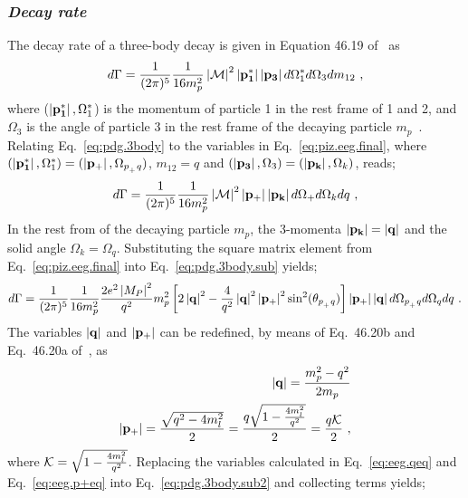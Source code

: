 \subsubsection{\emph{Decay rate}}
The decay rate of a three-body decay is given in Equation 46.19 of~\cite{pdg2014} as
\begin{align}\label{eq:pdg.3body}
d\Gamma = \frac{1}{(2 \pi)^5} \frac{1}{16 m_p^2} \left|{\cal M}\right|^2 \left|\bf{p_1^*}\right| \left|\bf{p_3}\right|d\Omega_1^*d\Omega_3 dm_{12} \ ,
\end{align}
%
where ($\left|\bf{p_1^*}\right|,\Omega_1^*$) is the momentum of particle 1 in the rest frame of 1 and 2, and $\Omega_3$ is the angle of particle 3 in the rest frame of the decaying particle $m_p$~\cite{pdg2014}. Relating Eq.~\ref{eq:pdg.3body} to the variables in Eq.~\ref{eq:piz.eeg.final}, where $(\left|\bf{p_1^*}\right|,\Omega_1^*) = (\left|\bf{p_+}\right|,\Omega_{p_{_+}q})$, $m_{12} = q$ and $(\left|\bf{p_3}\right|,\Omega_3) = (\left|\bf{p_k}\right|,\Omega_k)$, reads;
\begin{align}\label{eq:pdg.3body.sub}
d\Gamma = \frac{1}{(2 \pi)^5} \frac{1}{16 m_p^2} \left|{\cal M}\right|^2 \left|\bf{p_+}\right| \left|\bf{p_k}\right|d\Omega_+d\Omega_k dq \ ,
\end{align}
%
In the rest from of the decaying particle $m_p$, the 3-momenta $\left|\bf{p_k}\right| = \left|\bf{q}\right|$ and the solid angle $\Omega_k = \Omega_q$. Substituting the square matrix element from Eq.~\ref{eq:piz.eeg.final} into Eq.~\ref{eq:pdg.3body.sub} yields;
%
\begin{align}\label{eq:pdg.3body.sub2}
d\Gamma = \frac{1}{(2 \pi)^5} \frac{1}{16 m_p^2} \frac{2e^{2}\left|M_{P}\right|^{2}}{q^{2}}m_p^2
\left[2\left|\bf{q}\right|^2 - \frac{4}{q^2} \left|\bf{q}\right|^2 \left|\bf{p_{+}}\right|^2 \sin^2(\theta_{p_{_+}q}) \right] \left|\bf{p_+}\right| \left|\bf{q}\right|d\Omega_{p_{_+}q}d\Omega_q dq\ .
\end{align}
The variables $\left|\bf{q}\right|$ and $\left|\bf{p_+}\right|$ can be redefined, by means of Eq.~46.20b and Eq.~46.20a of~\cite{pdg2014}, as 
\begin{align}
\left|\bf{q}\right| = \frac{m_p^2 - q^2}{2m_p} \label{eq:eeg.qeq} \\
\left|\bf{p_+}\right| = \frac{\sqrt{q^2 - 4m_l^2}}{2} = \frac{q\sqrt{1 - \frac{4m_l^2}{q^2} } } {2} =\frac{q {\cal K}  } {2}  \label{eq:eeg.p+eq} \ ,
\end{align} 
where ${\cal K} = \sqrt{1 - \frac{4m_l^2}{q^2}}$. Replacing the variables calculated in Eq.~\ref{eq:eeg.qeq} and Eq.~\ref{eq:eeg.p+eq} into Eq.~\ref{eq:pdg.3body.sub2} and collecting terms yields;
